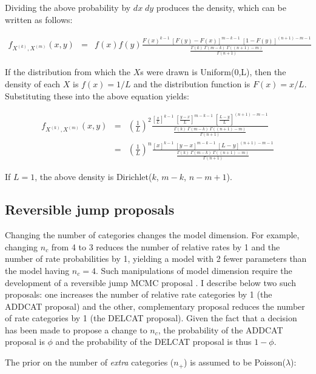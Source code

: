 \documentclass[12pt]{article}
\newcommand{\ncat}{n_c}
\newcommand{\nxtra}{n_{+}}
\begin{document}
Dividing the above probability by $dx \; dy$ produces the density, which can be written as follows:

\begin{eqnarray*}
f_{X^{(k)}, X^{(m)}}(x,y) & = & f(x) f(y) \frac{F(x)^{k-1} \; \left[ F(y) - F(x) \right]^{m-k-1} \; \left[ 1 - F(y) \right]^{(n+1)-m-1}}{\frac{\Gamma(k) \; \Gamma(m-k) \; \Gamma((n+1)-m)}{\Gamma(n+1)}}
\end{eqnarray*}

If the distribution from which the $X$s were drawn is Uniform(0,L), then the density of each $X$ is $f(x) = 1/L$ and the distribution function is $F(x) = x/L$. Substituting these into the above equation yields:

\begin{eqnarray*}
f_{X^{(k)}, X^{(m)}}(x,y) & = & \left( \frac{1}{L} \right)^2 \frac{\left[ \frac{x}{L} \right]^{k-1} \; \left[ \frac{y-x}{L} \right]^{m-k-1} \; \left[ \frac{L-y}{L} \right]^{(n+1)-m-1}}{\frac{\Gamma(k) \; \Gamma(m-k) \; \Gamma((n+1)-m)}{\Gamma(n+1)}} \\
& = & \left( \frac{1}{L} \right)^n \frac{\left[x\right]^{k-1} \; \left[y-x\right]^{m-k-1} \; \left[L-y\right]^{(n+1)-m-1}}{\frac{\Gamma(k) \; \Gamma(m-k) \; \Gamma((n+1)-m)}{\Gamma(n+1)}}
\end{eqnarray*}

If $L=1$, the above density is Dirichlet($k$, $m-k$, $n-m+1$).

\subsection{Reversible jump proposals}

Changing the number of categories changes the model dimension. For example, changing $\ncat$ from 4 to 3 reduces the number of relative rates by 1 and the number of rate probabilities by 1, yielding a model with 2 fewer parameters than the model having $\ncat = 4$. Such manipulations of model dimension require the development of a reversible jump MCMC proposal \citep{Green1995}. I describe below two such proposals: one increases the number of relative rate categories by 1 (the ADDCAT proposal) and the other, complementary proposal reduces the number of rate categories by 1 (the DELCAT proposal). Given the fact that a decision has been made to propose a change to $\ncat$, the probability of the ADDCAT proposal is $\phi$ and the probability of the DELCAT proposal is thus $1-\phi$. 

The prior on the number of {\em extra} categories ($\nxtra$) is assumed to be Poisson($\lambda$):
\end{document}
